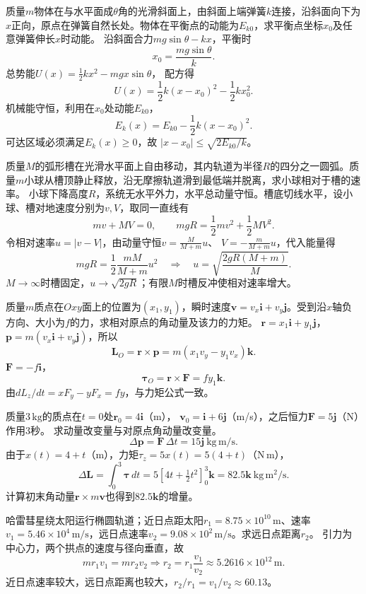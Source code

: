 \problemtext 质量$m$物体在与水平面成$\theta$角的光滑斜面上，由斜面上端弹簧$k$连接，沿斜面向下为$x$正向，原点在弹簧自然长处。物体在平衡点的动能为$E_{k0}$，求平衡点坐标$x_0$及任意弹簧伸长$x$时动能。
\workings
沿斜面合力$mg\sin\theta-kx$，平衡时
\[
\boxed{x_0=\frac{mg\sin\theta}{k}}.
\]
总势能$U(x)=\frac12kx^2-mgx\sin\theta$，
配方得
\[
U(x)=\frac12k(x-x_0)^2-\frac12kx_0^2.
\]
机械能守恒，利用在$x_0$处动能$E_{k0}$，
\[
\boxed{E_k(x)=E_{k0}-\frac12k(x-x_0)^2}.
\]
\crosscheck 可达区域必须满足$E_k(x)\ge0$，故
$|x-x_0|\le\sqrt{2E_{k0}/k}$。

\problemtext 质量$M$的弧形槽在光滑水平面上自由移动，其内轨道为半径$R$的四分之一圆弧。质量$m$小球从槽顶静止释放，沿无摩擦轨道滑到最低端并脱离，求小球相对于槽的速率。
\workings
小球下降高度$R$，系统无水平外力，水平总动量守恒。槽底切线水平，设小球、槽对地速度分别为$v,V$，取同一直线有
\[
mv+MV=0,\qquad
mgR=\frac12mv^2+\frac12MV^2.
\]
令相对速率$u=|v-V|$，由动量守恒$v=\frac{M}{M+m}u$、
$V=-\frac{m}{M+m}u$，代入能量得
\[
mgR=\frac12\frac{mM}{M+m}u^2
\quad\Longrightarrow\quad
\boxed{u=\sqrt{\frac{2gR(M+m)}{M}}}.
\]
\crosscheck $M\to\infty$时槽固定，$u\to\sqrt{2gR}$；有限$M$时槽反冲使相对速率增大。

\problemtext 质量$m$质点在$Oxy$面上的位置为$(x_1,y_1)$，瞬时速度$\bm v=v_x\bm i+v_y\bm j$。受到沿$x$轴负方向、大小为$f$的力，求相对原点的角动量及该力的力矩。
\workings
$\bm r=x_1\bm i+y_1\bm j$，$\bm p=m(v_x\bm i+v_y\bm j)$，所以
\[
\boxed{\bm L_O=\bm r\times\bm p
=m(x_1v_y-y_1v_x)\bm k}.
\]
$\bm F=-f\bm i$，
\[
\boxed{\bm\tau_O=\bm r\times\bm F=f y_1\bm k}.
\]
\crosscheck 由$dL_z/dt=xF_y-yF_x=f y$，与力矩公式一致。

\problemtext 质量$3\,\mathrm{kg}$的质点在$t=0$处$\bm r_0=4\bm i$（m），
$\bm v_0=\bm i+6\bm j$（m/s），之后恒力$\bm F=5\bm j$（N）作用$3$秒。
求动量改变量与对原点角动量改变量。
\workings
\[
\boxed{\Delta\bm p=\bm F\,\Delta t=15\bm j\ \mathrm{kg\,m/s}}.
\]
由于$x(t)=4+t$（m），力矩$\tau_z=5x(t)=5(4+t)$（N\,m），
\[
\boxed{\Delta\bm L=\int_0^3\bm\tau\,dt
=5\left[4t+\tfrac12 t^2\right]_{0}^{3}\bm k
=82.5\bm k\ \mathrm{kg\,m^2/s}}.
\]
\crosscheck 计算初末角动量$\bm r\times m\bm v$也得到$82.5\bm k$的增量。

\problemtext 哈雷彗星绕太阳运行椭圆轨道；近日点距太阳$r_1=8.75\times10^{10}\,\mathrm m$、速率$v_1=5.46\times10^4\,\mathrm{m/s}$，远日点速率$v_2=9.08\times10^2\,\mathrm{m/s}$。求远日点距离$r_2$。
\workings
引力为中心力，两个拱点的速度与径向垂直，故
\[
mr_1v_1=mr_2v_2
\Longrightarrow
\boxed{r_2=r_1\frac{v_1}{v_2}
\approx5.2616\times10^{12}\,\mathrm m}.
\]
\crosscheck 近日点速率较大，远日点距离也较大，$r_2/r_1=v_1/v_2\approx60.13$。


